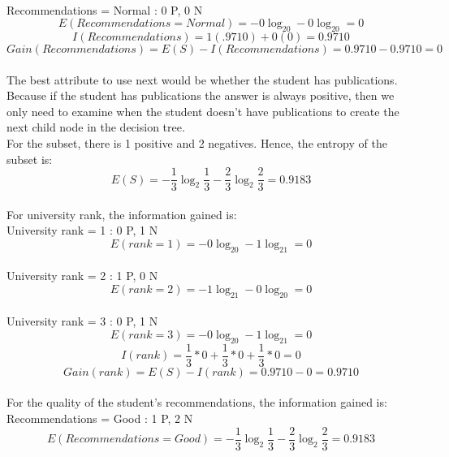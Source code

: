 \documentclass[12pt]{article}
\begin{document}
\\
Recommendations = Normal : 0 P, 0 N
\begin{equation}
E(Recommendations = Normal) = -0\log_20-0\log_20 = 0
\end{equation}
\begin{equation}
I(Recommendations) = 1(.9710)+0(0) = 0.9710
\end{equation}
\begin{equation}
Gain(Recommendations) = E(S) - I(Recommendations) = 0.9710 - 0.9710 = 0
\end{equation}
\\
The best attribute to use next would be whether the student has publications. Because if the student has publications the answer is always positive, then we only need to examine when the student doesn't have publications to create the next child node in the decision tree.
\\
For the subset, there is 1 positive and 2 negatives. Hence, the entropy of the subset is:
\\
\begin{equation}
E(S) = -\frac{1}{3}\log_2\frac{1}{3} - \frac{2}{3}\log_2\frac{2}{3} = 0.9183
\end{equation}
\\
For university rank, the information gained is:
\\
University rank = 1 : 0 P, 1 N
\begin{equation}
E(rank = 1) = -0\log_20 - 1\log_21 = 0
\end{equation}
\\
University rank = 2 : 1 P, 0 N
\begin{equation}
E(rank = 2) = -1\log_21 -0\log_20 = 0
\end{equation}
\\
University rank = 3 : 0 P, 1 N
\begin{equation}
E(rank = 3) = -0\log_20 - 1\log_21 = 0
\end{equation}
\begin{equation}
I(rank) = \frac{1}{3} * 0 + \frac{1}{3} * 0 + \frac{1}{3} * 0 = 0
\end{equation}
\begin{equation}
Gain(rank) = E(S) - I(rank) = 0.9710 - 0 = 0.9710
\end{equation}
\\
For the quality of the student's recommendations, the information gained is:
\\
Recommendations = Good : 1 P, 2 N
\begin{equation}
E(Recommendations = Good) = -\frac{1}{3}\log_2\frac{1}{3} - \frac{2}{3}\log_2\frac{2}{3} = 0.9183
\end{equation}
\end{document}
